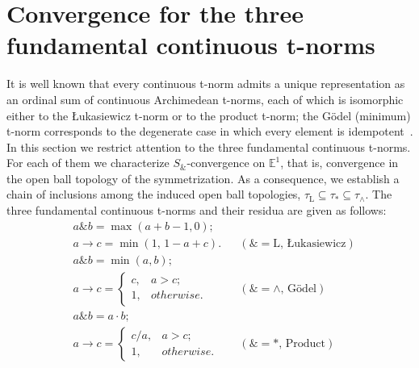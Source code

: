 \documentclass[preprint,3p,times]{elsarticle}
\theoremstyle{plain}
\theoremstyle{definition}
\newcommand{\Luk}{\mathrm{L}}
\numberwithin{equation}{section}
\begin{document}
\section{Convergence for the three fundamental continuous t-norms}
It is well known that every continuous t-norm admits a unique representation
as an ordinal sum of continuous Archimedean t-norms, each of which is isomorphic
either to the {\L}ukasiewicz t-norm or to the product t-norm; the G\"odel
(minimum) t-norm corresponds to the degenerate case in which every element is
idempotent~\cite[Theorem~2.4.3]{Alsina2006}. In this section we restrict attention to the three fundamental continuous t-norms.
For each of them we characterize \(S_{\&}\)-convergence on \(\mathbb{E}^1\), that is, convergence in the open
ball topology of the symmetrization. As a consequence, we establish a chain of inclusions
among the induced open ball topologies,
\(\tau_{\Luk}\subseteq \tau_{*}\subseteq \tau_{\wedge}\).
The three fundamental continuous t-norms and their residua are given as follows:
\begin{align*}
& a \& b = \max(a + b - 1, 0); \\
& a \to c =  \min(1,\, 1-a+c).
&& (\text{\(\&=\Luk\), {\L}ukasiewicz}) \\[1em]
& a \& b = \min(a, b); \\
& a \to c =\begin{cases}
    c, &a>c;\\
    1, &otherwise.
\end{cases} 
&& (\text{\(\&=\wedge\), G\"odel}) \\[1em]
& a \& b = a \cdot b; \\
& a \to c = \begin{cases}
    c / a, &a>c;\\
    1,&otherwise.
\end{cases}
&& (\text{\(\&=*\), Product})
\end{align*}
\end{document}
